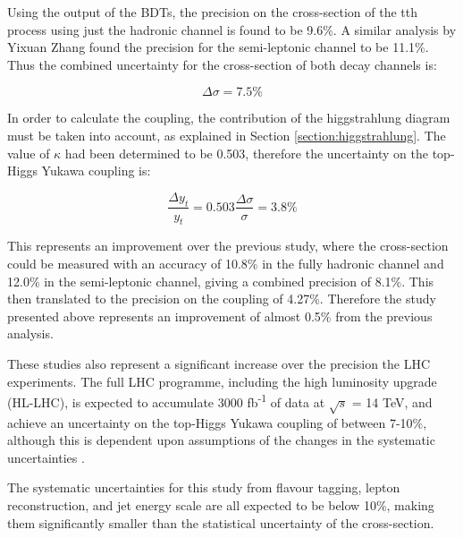 Using the output of the \acrshort{BDT}s, the precision on the cross-section of the tth process using just the hadronic channel is found to be 9.6\%. A similar analysis by Yixuan Zhang found the precision for the semi-leptonic channel to be 11.1\%. Thus the combined uncertainty for the cross-section of both decay channels is:

\begin{equation}
	\Delta\sigma = 7.5\%
\label{eq:result-crosssection}
\end{equation}

In order to calculate the coupling, the contribution of the higgstrahlung diagram must be taken into account, as explained in Section \ref{section:higgstrahlung}. The value of $\kappa$ had been determined to be 0.503, therefore the uncertainty on the top-Higgs Yukawa coupling is:

\begin{equation}
	\frac{\Delta y_t}{y_t} = 0.503 \frac{\Delta\sigma}{\sigma} = 3.8\%
\label{eq:result-coupling}
\end{equation}

This represents an improvement over the previous study, where the cross-section could be measured with an accuracy of 10.8\% in the fully hadronic channel and 12.0\% in the semi-leptonic channel, giving a combined precision of 8.1\%. This then translated to the precision on the coupling of 4.27\%. Therefore the study presented above represents an improvement of almost 0.5\% from the previous analysis.

These studies also represent a significant increase over the precision the \acrshort{LHC} experiments. The full \acrshort{LHC} programme, including the high luminosity upgrade (\acrshort{HL-LHC}), is expected to accumulate 3000 fb\textsuperscript{-1} of data at $\sqrt{s}$ = 14 TeV, and achieve an uncertainty on the top-Higgs Yukawa coupling of between 7-10\%, although this is dependent upon assumptions of the changes in the systematic uncertainties \cite{lhc-top-yukawa}.

The systematic uncertainties for this study from flavour tagging, lepton reconstruction, and jet energy scale are all expected to be below 10\%, making them significantly smaller than the statistical uncertainty of the cross-section. %

